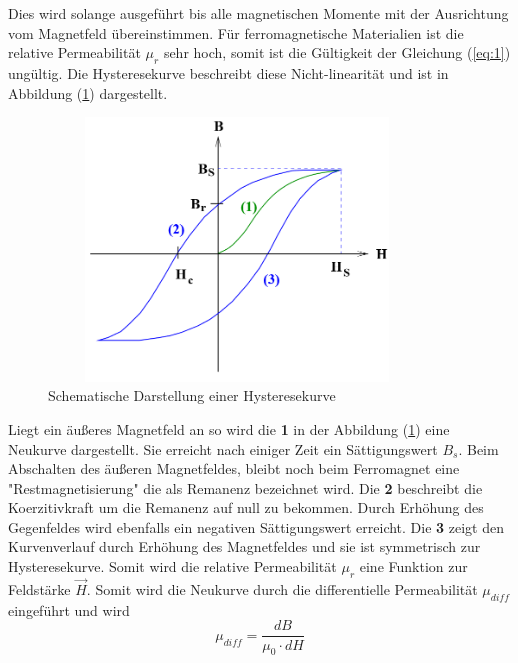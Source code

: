 Dies wird solange ausgeführt bis alle magnetischen Momente mit der Ausrichtung vom Magnetfeld übereinstimmen.
Für ferromagnetische Materialien ist die relative Permeabilität $\mu_r$ sehr hoch, somit ist die Gültigkeit der
Gleichung (\ref{eq:1}) ungültig.
Die Hysteresekurve beschreibt diese Nicht-linearität und ist in Abbildung (\ref{abb:3}) dargestellt.
\begin{figure}[H]
  \centering
  \includegraphics[width=10cm, height= 7cm]{Abb3.png}
  \caption{Schematische Darstellung einer Hysteresekurve}
  \label{abb:3}
\end{figure}
Liegt ein äußeres Magnetfeld an so wird die \textbf{1} in der Abbildung (\ref{abb:3}) eine
Neukurve dargestellt. Sie erreicht nach einiger Zeit ein Sättigungswert $B_s$. Beim Abschalten
des äußeren Magnetfeldes, bleibt noch beim Ferromagnet eine "Restmagnetisierung" die
als Remanenz bezeichnet wird. Die \textbf{2} beschreibt die Koerzitivkraft um die Remanenz auf null zu bekommen.
Durch Erhöhung des Gegenfeldes wird ebenfalls ein negativen Sättigungswert erreicht.
Die \textbf{3} zeigt den Kurvenverlauf durch Erhöhung des Magnetfeldes und sie ist symmetrisch zur Hysteresekurve.
Somit wird die relative Permeabilität $\mu_r$ eine Funktion zur Feldstärke $\vec{H}$.
Somit wird die Neukurve durch die differentielle Permeabilität $\mu_{diff}$ eingeführt und wird
\begin{equation}
  \mu_{diff} = \frac{dB}{\mu_0 \cdot dH}
  \label{eq:6}
\end{equation}
